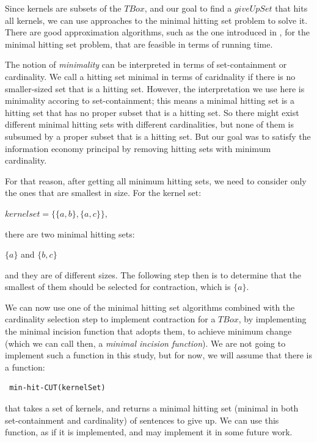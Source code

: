 Since kernels are subsets of the $TBox$, and our goal to find a $giveUpSet$ that hits all kernels, we can use approaches to the minimal hitting set problem to solve it. There are good approximation algorithms, such as the one introduced in \cite{hit}, for the minimal hitting set problem, that are feasible in terms of running time. 

The notion of \textit{minimality} can be interpreted in terms of set-containment or cardinality. We call a hitting set minimal in terms of caridnality if there is no smaller-sized set that is a hitting set. However, the interpretation we use here is minimality accoring to set-containment; this means a minimal hitting set is a hitting set that has no proper subset that is a hitting set. So there might exist different minimal hitting sets with different cardinalities, but none of them is subsumed by a proper subset that is a hitting set\cite{hit}. But our goal was to satisfy the information economy principal by removing hitting sets with minimum cardinality. 

For that reason, after getting all minimum hitting sets, we need to consider only the ones that are smallest in size. For the kernel set:
\begin{center}
$kernelset = \lbrace \lbrace a, b \rbrace , \lbrace a, c \rbrace \rbrace$,
\end{center}
there are two minimal hitting sets:
\begin{center}
$\lbrace a \rbrace$ \hspace{1cm} and \hspace{1cm} $\lbrace b, c \rbrace$
\end{center}
and they are of different sizes. The following step then is to determine that the smallest of them should be selected for contraction, which is $\lbrace a \rbrace$.

We can now use one of the minimal hitting set algorithms combined with the cardinality selection step to implement contraction for a $TBox$, by implementing the minimal incision function that adopts them, to achieve minimum change (which we can call then, a \textit{minimal incision function}). We are not going to implement such a function in this study, but for now, we will assume that there is a function:
\begin{verbatim}
 min-hit-CUT(kernelSet)
\end{verbatim}
that takes a set of kernels, and returns a minimal hitting set (minimal in both set-containment and cardinality) of sentences to give up. We can use this function, as if it is implemented, and may implement it in some future work.

